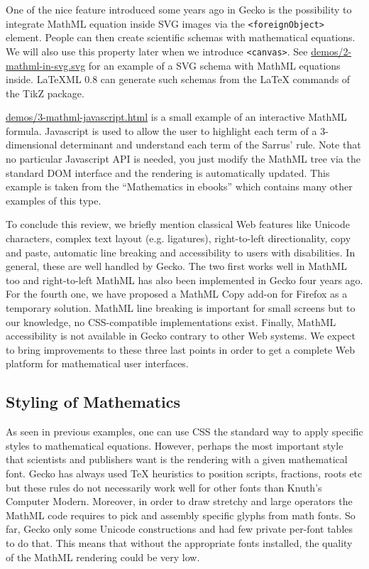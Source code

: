 One of the nice feature introduced some years ago in Gecko is the possibility
to integrate MathML equation inside SVG images via the {\tt <foreignObject>}
element. People can then create
scientific schemas with mathematical equations.
We will also use this property later when we introduce {\tt <canvas>}.
See \href{http://fred-wang.github.io/MathUI2014/demos/2-mathml-in-svg.svg}{demos/2-mathml-in-svg.svg} for an example of a SVG schema with
MathML equations inside. LaTeXML 0.8 can generate
such schemas from the LaTeX commands of the TikZ package.

\href{http://fred-wang.github.io/MathUI2014/demos/3-mathml-javascript.html}{demos/3-mathml-javascript.html} is a small example of an
interactive MathML formula. Javascript is used to allow the user to highlight
each term of a 3-dimensional determinant and understand each term of the
Sarrus' rule. Note that no particular Javascript API is needed, you just
modify the MathML tree via the standard DOM interface and the rendering
is automatically updated.
This example is taken from the ``Mathematics in ebooks'' which contains
many other examples of this type.

To conclude this review, we briefly mention classical Web features like
Unicode characters, complex text layout (e.g. ligatures),
right-to-left directionality, copy and paste, automatic line breaking and
accessibility to users with disabilities.
In general, these are well handled by Gecko. The two first
works well in MathML too and right-to-left MathML has also been implemented in
Gecko four years ago. For the fourth one, we have proposed a MathML Copy
add-on for Firefox as a temporary solution. MathML line breaking is important
for small screens but to our knowledge, no CSS-compatible implementations exist.
Finally, MathML accessibility is not available in Gecko contrary to
other Web systems. We expect to
bring improvements to these three last points in order to get a complete Web
platform for mathematical user interfaces.

\subsection{Styling of Mathematics}

As seen in previous examples, one can use CSS the standard way to apply
specific styles to mathematical equations. However, perhaps the most important
style that scientists and publishers want is the rendering with a given
mathematical font. Gecko has always used TeX heuristics to position scripts,
fractions, roots etc but these rules do not necessarily work well for other
fonts than Knuth's Computer Modern. Moreover, in order to draw stretchy and
large operators the MathML code requires to pick and assembly specific glyphs
from math fonts. So far, Gecko only some Unicode constructions and had
few private per-font tables to do that. This means that without the appropriate
fonts installed, the quality of the MathML rendering could be very low.

